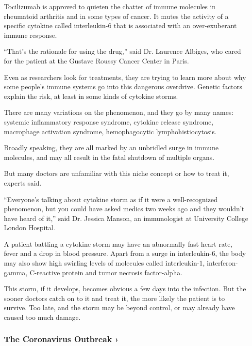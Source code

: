 Tocilizumab is approved to quieten the chatter of immune molecules in
rheumatoid arthritis and in some types of cancer. It mutes the activity
of a specific cytokine called interleukin-6 that is associated with an
over-exuberant immune response.

``That's the rationale for using the drug,'' said Dr. Laurence Albiges,
who cared for the patient at the Gustave Roussy Cancer Center in Paris.

Even as researchers look for treatments, they are trying to learn more
about why some people's immune systems go into this dangerous overdrive.
Genetic factors explain the risk, at least in some kinds of cytokine
storms.

There are many variations on the phenomenon, and they go by many names:
systemic inflammatory response syndrome, cytokine release syndrome,
macrophage activation syndrome, hemophagocytic lymphohistiocytosis.

Broadly speaking, they are all marked by an unbridled surge in immune
molecules, and may all result in the fatal shutdown of multiple organs.

But many doctors are unfamiliar with this niche concept or how to treat
it, experts said.

``Everyone's talking about cytokine storm as if it were a
well-recognized phenomenon, but you could have asked medics two weeks
ago and they wouldn't have heard of it,'' said Dr. Jessica Manson, an
immunologist at University College London Hospital.

A patient battling a cytokine storm may have an abnormally fast heart
rate, fever and a drop in blood pressure. Apart from a surge in
interleukin-6, the body may also show high swirling levels of molecules
called interleukin-1, interferon-gamma, C-reactive protein and tumor
necrosis factor-alpha.

This storm, if it develops, becomes obvious a few days into the
infection. But the sooner doctors catch on to it and treat it, the more
likely the patient is to survive. Too late, and the storm may be beyond
control, or may already have caused too much damage.

\href{https://www.nytimes.com/news-event/coronavirus?action=click\&pgtype=Article\&state=default\&region=MAIN_CONTENT_3\&context=storylines_faq}{}

\hypertarget{the-coronavirus-outbreak-}{%
\subsubsection{The Coronavirus Outbreak
›}\label{the-coronavirus-outbreak-}}

